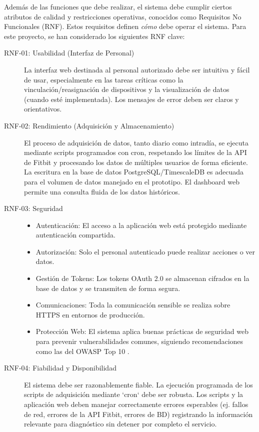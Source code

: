 Además de las funciones que debe realizar, el sistema debe cumplir ciertos atributos de calidad y restricciones operativas, conocidos como Requisitos No Funcionales (RNF). Estos requisitos definen \textit{cómo} debe operar el sistema. Para este proyecto, se han considerado los siguientes RNF clave:

\begin{description}
    \item[RNF-01: Usabilidad (Interfaz de Personal)] La interfaz web destinada al personal autorizado debe ser intuitiva y fácil de usar, especialmente en las tareas críticas como la vinculación/reasignación de dispositivos y la visualización de datos (cuando esté implementada). Los mensajes de error deben ser claros y orientativos.
    \item[RNF-02: Rendimiento (Adquisición y Almacenamiento)] El proceso de adquisición de datos, tanto diario como intradía, se ejecuta mediante scripts programados con cron, respetando los límites de la API de Fitbit\textsuperscript{\textregistered} y procesando los datos de múltiples usuarios de forma eficiente. La escritura en la base de datos PostgreSQL/TimescaleDB es adecuada para el volumen de datos manejado en el prototipo. El dashboard web permite una consulta fluida de los datos históricos.
    \item[RNF-03: Seguridad]
        \begin{itemize}
            \item Autenticación: El acceso a la aplicación web está protegido mediante autenticación compartida.
            \item Autorización: Solo el personal autenticado puede realizar acciones o ver datos.
            \item Gestión de Tokens: Los tokens OAuth 2.0 se almacenan cifrados en la base de datos y se transmiten de forma segura.
            \item Comunicaciones: Toda la comunicación sensible se realiza sobre HTTPS en entornos de producción.
            \item Protección Web: El sistema aplica buenas prácticas de seguridad web para prevenir vulnerabilidades comunes, siguiendo recomendaciones como las del OWASP Top 10 \cite{owasp_top10}.
        \end{itemize}
    \item[RNF-04: Fiabilidad y Disponibilidad] El sistema debe ser razonablemente fiable. La ejecución programada de los scripts de adquisición mediante `cron` debe ser robusta. Los scripts y la aplicación web deben manejar correctamente errores esperables (ej. fallos de red, errores de la API Fitbit, errores de BD) registrando la información relevante para diagnóstico sin detener por completo el servicio.

\end{description}
